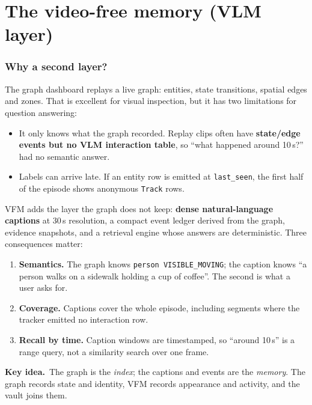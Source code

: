 \documentclass[10pt,a4paper]{article}
\makeatletter
\newcommand{\code}[1]{\texttt{\small #1}}
\newcommand{\vlm}[1]{\textcolor{vlm}{\textbf{#1}}}
\newcommand{\needspace}[1]{%
  \par\penalty-100
  \begingroup
  \dimen@=#1\relax
  \ifdim\pagegoal<\maxdimen
    \advance\dimen@\pagetotal
    \ifdim\dimen@>\pagegoal
      \vfil\break
    \fi
  \fi
  \endgroup}
\newcommand{\keyidea}[1]{%
  \par\medskip\noindent\colorbox{panel}{%
    \begin{minipage}{\dimexpr\linewidth-2\fboxsep\relax}
    \vspace{2pt}\textbf{\textcolor{accent}{Key idea.}}\ #1\vspace{2pt}
    \end{minipage}}\par\medskip
}
\makeatother
\begin{document}
\needspace{9\baselineskip}
\part{The video-free memory (VLM layer)}

\section{Why a second layer?}

The graph dashboard replays a live graph: entities, state transitions, spatial edges and zones. That
is excellent for visual inspection, but it has two limitations for question answering:

\begin{itemize}[leftmargin=1.2em,itemsep=1pt]
  \item It only knows what the graph recorded. Replay clips often have \textbf{state/edge events but
        no VLM interaction table}, so ``what happened around 10\,s?'' had no semantic answer.
  \item Labels can arrive late. If an entity row is emitted at \code{last\_seen}, the first half of
        the episode shows anonymous \code{Track} rows.
\end{itemize}

\noindent
VFM adds the layer the graph does not keep: \vlm{dense natural-language captions} at 30\,s
resolution, a compact event ledger derived from the graph, evidence snapshots, and a retrieval engine
whose answers are deterministic. Three consequences matter:

\begin{enumerate}[leftmargin=1.25em,itemsep=1pt]
  \item \textbf{Semantics.} The graph knows \code{person VISIBLE\_MOVING}; the caption knows ``a
        person walks on a sidewalk holding a cup of coffee''. The second is what a user asks for.
  \item \textbf{Coverage.} Captions cover the whole episode, including segments where the tracker
        emitted no interaction row.
  \item \textbf{Recall by time.} Caption windows are timestamped, so ``around 10\,s'' is a range
        query, not a similarity search over one frame.
\end{enumerate}

\keyidea{The graph is the \emph{index}; the captions and events are the \emph{memory}. The graph
records state and identity, VFM records appearance and activity, and the vault joins them.}
\end{document}
